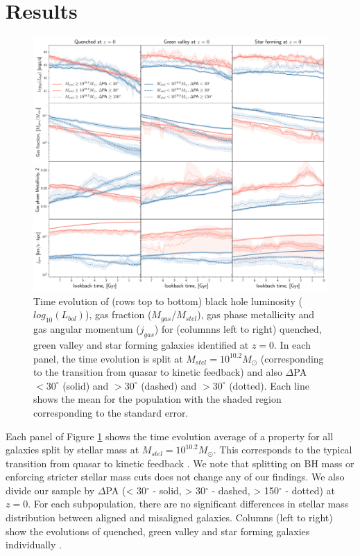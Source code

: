 \documentclass[fleqn,usenatbib]{mnras}
\begin{document}
\section{Results} \label{sec:results}
\begin{figure}
	\includegraphics[width=\linewidth]{overall_population/overall_pop_evolution_Mstel10_2_nosfr.pdf}
    \caption{Time evolution of (rows top to bottom) black hole luminosity ($log_{10}(L_{bol})$), gas fraction ($M_{gas}$/$M_{stel}$), gas phase metallicity and gas angular momentum ($j_{gas}$) for (columnns left to right) quenched, green valley and star forming galaxies identified at $z=0$. In each panel, the time evolution is split at $M_{stel} = 10^{10.2}M_{\odot}$ (corresponding to the transition from quasar to kinetic feedback) and also $\Delta$PA $< 30^{\circ}$ (solid) and $> 30^{\circ}$ (dashed) and  $> 30^{\circ}$ (dotted). Each line shows the mean for the population with the shaded region corresponding to the standard error.}
    \label{fig:overall_pop}
\end{figure}

Each panel of Figure \ref{fig:overall_pop} shows the time evolution average of a property for all galaxies split by stellar mass at $M_{stel} = 10^{10.2}M_{\odot}$. This corresponds to the typical transition from quasar to kinetic feedback \citep[i.e. $M_{BH} \approx 10^{8}M_{\odot}$, see Fig 1 in][]{li2019}. We note that splitting on BH mass or enforcing stricter stellar mass cuts does not change any of our findings. We also divide our sample by $\Delta$PA (< 30$^{\circ}$ - solid, > 30$^{\circ}$ - dashed, > 150$^{\circ}$ - dotted) at $z=0$. For each subpopulation, there are no significant differences in stellar mass distribution between aligned and misaligned galaxies. Columns (left to right) show the evolutions of quenched, green valley and star forming galaxies individually \cite[defined by deviation from the star forming main-sequence in][]{pillepich2019}. 
\end{document}

